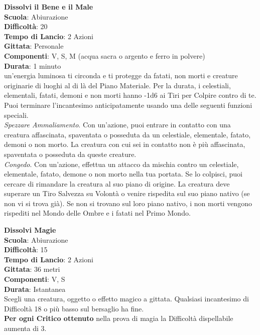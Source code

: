 \begin{multicols}{2}
\medskip\textbf{Dissolvi il Bene e il Male}\\
\textbf{Scuola}: Abiurazione\\
\textbf{Difficoltà}:  20\\
\textbf{Tempo di Lancio}: 2 Azioni\\
\textbf{Gittata}: Personale\\
\textbf{Componenti}: V, S, M (acqua sacra o argento e ferro in polvere)\\
\textbf{Durata}: 1 minuto \\
un'energia luminosa ti circonda e ti protegge da fatati, non morti e creature originarie di luoghi al di là del Piano Materiale. Per la durata, i celestiali, elementali, fatati, demoni e non morti hanno -1d6 ai Tiri per Colpire contro di te. Puoi terminare l'incantesimo anticipatamente usando una delle seguenti funzioni speciali.\\
\textit{Spezzare Ammaliamento}. Con un'azione, puoi entrare in contatto con una creatura affascinata, spaventata o posseduta da un celestiale, elementale, fatato, demoni o non morto. La creatura con cui sei in contatto non è più affascinata, spaventata o posseduta da queste creature.\\
\textit{Congedo}. Con un'azione, effettua un attacco da mischia contro un celestiale, elementale, fatato, demone o non morto nella tua portata. Se lo colpisci, puoi cercare di rimandare la creatura al suo piano di origine. La creatura deve superare un Tiro Salvezza su Volontà o venire rispedita sul suo piano nativo (se non vi si trova già). Se non si trovano sul loro piano nativo, i non morti vengono rispediti nel Mondo delle Ombre e i fatati nel Primo Mondo.

\medskip\textbf{Dissolvi Magie}\\
\textbf{Scuola}: Abiurazione\\
\textbf{Difficoltà}:  15\\
\textbf{Tempo di Lancio}: 2 Azioni\\
\textbf{Gittata}: 36 metri\\
\textbf{Componenti}: V, S\\
\textbf{Durata}: Istantanea\\
Scegli una creatura, oggetto o effetto magico a gittata. Qualsiasi incantesimo di Difficoltà 18 o più basso sul bersaglio ha fine. \\
\textbf{Per ogni Critico ottenuto} nella prova di magia la Difficoltà dispellabile aumenta di 3.


\end{multicols}
